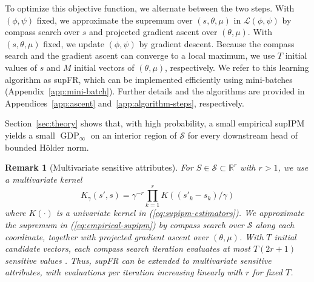 \documentclass{article} %
\newtheorem{remark}{Remark}
\begin{document}
To optimize this objective function, we alternate between the two steps.
With $(\phi,\psi)$ fixed, we approximate the supremum over $(s,\theta,\mu)$ in $\mathcal{L}(\phi,\psi)$ by compass search over $s$ \citep{kolda2003optimization} and projected gradient ascent over $(\theta,\mu)$.
With $(s,\theta,\mu)$ fixed, we update $(\phi,\psi)$ by gradient descent.
Because the compass search and the gradient ascent can converge to a local maximum, we use $T$ initial values of $s$ and $M$ initial vectors of $(\theta, \mu)$, respectively.  
We refer to this learning algorithm as supFR, which can be implemented efficiently using mini-batches (Appendix~\ref{app:mini-batch}).  Further details and the algorithms are provided in  Appendices~\ref{app:ascent} and~\ref{app:algorithm-steps}, respectively.

Section~\ref{sec:theory} shows that, with high probability, a small empirical supIPM yields a small $\operatorname{GDP}_{\infty}$ on an interior region of $\mathcal{S}$ for every downstream head of bounded H\"older norm.

\begin{remark}[Multivariate sensitive attributes]
\label{rem:multivariate-sensitive}
For $S\in\mathcal{S}\subset\mathbb{R}^r$ with $r>1$, we use a multivariate kernel 
\begin{equation*}
    K_{\gamma}(s',s)=\gamma^{-r}\prod_{k=1}^r K((s'_k-s_k)/\gamma)
\end{equation*}
where $K(\cdot)$ is a univariate kernel in (\ref{eq:supipm-estimators}).
We approximate the supremum in (\ref{eq:empirical-supipm}) by compass search over $\mathcal{S}$  along each coordinate, together with projected gradient ascent over $(\theta,\mu)$.
With $T$ initial candidate vectors, each compass search iteration evaluates at most $T(2r+1)$ sensitive values \citep{kolda2003optimization}.
Thus, supFR can be extended to multivariate sensitive attributes, with evaluations per iteration increasing linearly with $r$ for fixed $T$.
\end{remark}
\end{document}
